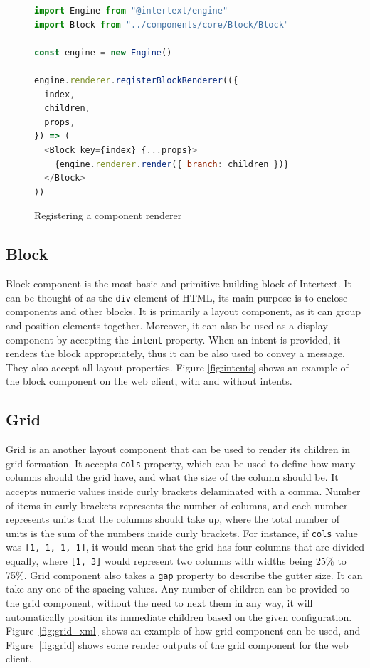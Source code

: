 \begin{figure}
\begin{minipage}{\linewidth}
\begin{lstlisting}[language=javascript]
import Engine from "@intertext/engine"
import Block from "../components/core/Block/Block"

const engine = new Engine()

engine.renderer.registerBlockRenderer(({
  index,
  children,
  props,
}) => (
  <Block key={index} {...props}>
    {engine.renderer.render({ branch: children })}
  </Block>
))
\end{lstlisting}
\end{minipage}
\caption{Registering a component renderer}%
\label{fig:registering_renderer}%
\end{figure}

\subsection{Block}

Block component is the most basic and primitive building block of Intertext. It can be thought of as the \texttt{div} element of HTML, its main purpose is to enclose components and other blocks. It is primarily a layout component, as it can group and position elements together. Moreover, it can also be used as a display component by accepting the \texttt{intent} property. When an intent is provided, it renders the block appropriately, thus it can be also used to convey a message. They also accept all layout properties. Figure \ref{fig:intents} shows an example of the block component on the web client, with and without intents.

\subsection{Grid}

Grid is an another layout component that can be used to render its children in grid formation. It accepts \texttt{cols} property, which can be used to define how many columns should the grid have, and what the size of the column should be. It accepts numeric values inside curly brackets delaminated with a comma. Number of items in curly brackets represents the number of columns, and each number represents units that the columns should take up, where the total number of units is the sum of the numbers inside curly brackets. For instance, if \texttt{cols} value was \texttt{[1, 1, 1, 1]}, it would mean that the grid has four columns that are divided equally, where \texttt{[1, 3]} would represent two columns with widths being 25\% to 75\%. Grid component also takes a \texttt{gap} property to describe the gutter size. It can take any one of the spacing values. Any number of children can be provided to the grid component, without the need to next them in any way, it will automatically position its immediate children based on the given configuration. Figure~\ref{fig:grid_xml} shows an example of how grid component can be used, and Figure~\ref{fig:grid} shows some render outputs of the grid component for the web client.

